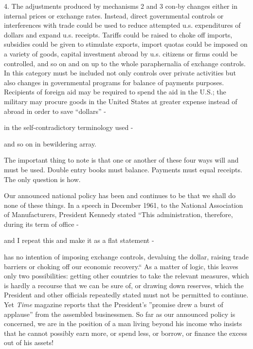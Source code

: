\documentclass[11pt,openany]{book}
\begin{document}
4. The adjustments produced by mechanisms 2 and 3 con-by changes either in internal prices or exchange rates. Instead, direct governmental controls or interferences with trade could be used to reduce attempted u.s. expenditures of dollars and expand u.s. receipts. Tariffs could be raised to choke off imports, subsidies could be given to stimulate exports, import quotas could be imposed on a variety of goods, capital investment abroad by u.s. citizens or firms could be controlled, and so on and on up to the whole paraphernalia of exchange controls. In this category must be included not only controls over private activities but also changes in governmental programs for balance of payments purposes. Recipients of foreign aid may be required to spend the aid in the U.S.; the military may procure goods in the United States at greater expense instead of abroad in order to save ``dollars'' -

in the self-contradictory terminology used -

and so on in bewildering array.

The important thing to note is that one or another of these four ways will and must be used. Double entry books must balance. Payments must equal receipts. The only question is how.

Our announced national policy has been and continues to be that we shall do none of these things. In a speech in December 1961, to the National Association of Manufacturers, President Kennedy stated ``This administration, therefore, during its term of office -

and I repeat this and make it as a flat statement -

has no intention of imposing exchange controls, devaluing the dollar, raising trade barriers or choking off our economic recovery.`` As a matter of logic, this leaves only two possibilities: getting other countries to take the relevant measures, which is hardly a recourse that we can be sure of, or drawing down reserves, which the President and other officials repeatedly stated must not be permitted to continue. Yet \emph{Time} magazine reports that the President's ''promise drew a burst of applause'' from the assembled businessmen. So far as our announced policy is concerned, we are in the position of a man living beyond his income who insists that he cannot possibly earn more, or spend less, or borrow, or finance the excess out of his assets!
\end{document}
